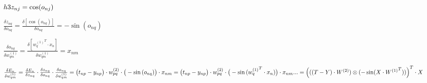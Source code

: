\documentclass[12pt]{article}
\begin{document}
$
h3 \\
z_{nj} = \cos(o_{nj})
$

$
\frac{\delta z_{nq}}{\delta o_{nq}} = \frac{\delta [\cos(o_{nq})]}{\delta o_{nq}} = -\sin{(o_{nq})}
$

$
\frac{\delta o_{nq}}{\delta w_{qm}^{(1)}} = \frac{\delta [{w_q^{(1)}}^T \cdot x_n]}{\delta w_{qm}^{(1)}} = x_{nm}
$

$
\frac{\delta E_n}{\delta w_{qm}^{(1)}} = \frac{\delta E_n}{\delta z_{nq}} \cdot \frac{\delta z_{nq}}{\delta o_{nq}} \cdot \frac{\delta o_{nq}}{\delta w_{qm}^{(1)}} \\
= \big( t_{np} - y_{np} \big) \cdot w_{pq}^{(2)} \cdot \big(-\sin{(o_{nq})}\big) \cdot x_{nm} \\
= \big( t_{np} - y_{np} \big) \cdot w_{pq}^{(2)} \cdot \big(-\sin{({w_q^{(1)}}^T \cdot x_n)}\big) \cdot x_{nm} \\
... \\
= {\Big(((T - Y) \cdot W^{(2)}) \otimes (-\sin (X \cdot {W^{(1)}}^T))\Big)}^T \cdot X
$
\end{document}

